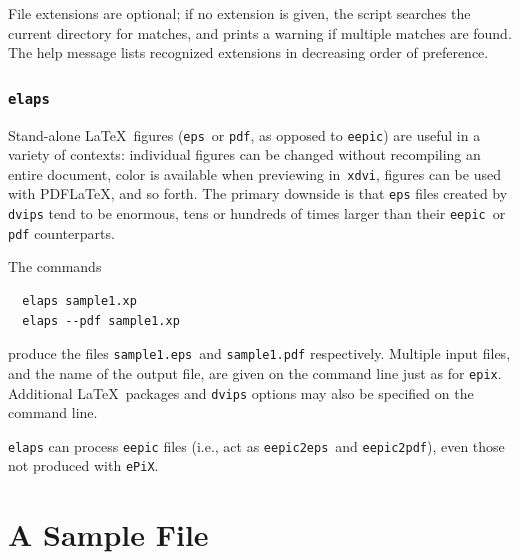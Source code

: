 \documentclass[12pt]{report}
\newcommand{\code}[1]{\texttt{#1}}
\newcommand{\filename}[1]{\texttt{#1}}
\newcommand{\ePiX}{\code{ePiX}}
\begin{document}
File extensions are optional; if no extension is given, the script
searches the current directory for matches, and prints a warning if
multiple matches are found. The help message lists recognized
extensions in decreasing order of preference.

\subsubsection*{\code{elaps}}

Stand-alone \LaTeX\ figures (\filename{eps}~or \filename{pdf}, as
opposed to \filename{eepic}) are useful in a variety of contexts:
individual figures can be changed without recompiling an entire
document, color is available when previewing in~\code{xdvi}, figures
can be used with PDF\LaTeX, and so forth. The primary downside is that
\filename{eps} files created by \code{dvips} tend to be enormous,
tens or hundreds of times larger than their \filename{eepic}~or
\code{pdf} counterparts.

The commands
\begin{verbatim}
  elaps sample1.xp
  elaps --pdf sample1.xp
\end{verbatim}
produce the files \filename{sample1.eps}~and \filename{sample1.pdf}
respectively. Multiple input files, and the name of the output file,
are given on the command line just as for \code{epix}. Additional
\LaTeX\ packages and \code{dvips} options may also be specified on the
command line.

\code{elaps} can process \filename{eepic} files (i.e., act as
\code{eepic2eps}~and \code{eepic2pdf}), even those not produced with
\ePiX.

\section{A Sample File}
\end{document}
